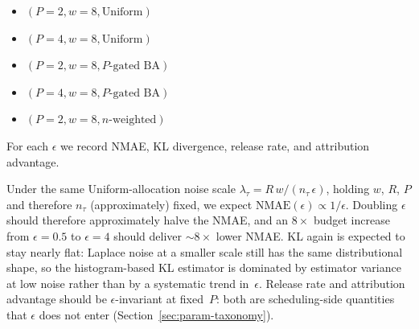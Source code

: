 \begin{itemize}
\item $(P=2, w=8, \mathrm{Uniform})$
\item $(P=4, w=8, \mathrm{Uniform})$
\item $(P=2, w=8, P\text{-gated BA})$
\item $(P=4, w=8, P\text{-gated BA})$
\item $(P=2, w=8, n\text{-weighted})$
\end{itemize}

For each $\epsilon$ we record NMAE, KL divergence, release rate, and attribution advantage.


Under the same Uniform-allocation noise scale $\lambda_\tau = R\,w/(n_\tau\,\epsilon)$, holding $w$, $R$, $P$ and therefore $n_\tau$ (approximately) fixed, we expect $\mathrm{NMAE}(\epsilon) \propto 1/\epsilon$. Doubling $\epsilon$ should therefore approximately halve the NMAE, and an $8\times$ budget increase from $\epsilon = 0.5$ to $\epsilon = 4$ should deliver $\sim\!8\times$ lower NMAE. KL again is expected to stay nearly flat: Laplace noise at a smaller scale still has the same distributional shape, so the histogram-based KL estimator is dominated by estimator variance at low noise rather than by a systematic trend in~$\epsilon$. Release rate and attribution advantage should be $\epsilon$-invariant at fixed~$P$: both are scheduling-side quantities that $\epsilon$ does not enter (Section~\ref{sec:param-taxonomy}).

